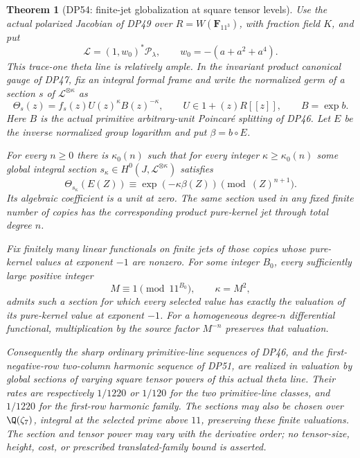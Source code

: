 \documentclass[11pt,a4paper]{article}
\newtheorem{theorem}{Theorem}[section]
\theoremstyle{definition}\newtheorem{remark}[theorem]{Remark}
\begin{document}
\begin{theorem}[DP54: finite-jet globalization at square tensor levels]\label{DP54}
Use the actual polarized Jacobian of DP49 over
$R=W(\mathbf F_{11^3})$, with fraction field $K$, and put
\[
 \mathcal L=(1,w_0)^*\mathcal P_\lambda,
 \qquad w_0=-(a+a^2+a^4).
\]
This trace-one theta line is relatively ample.
In the invariant product canonical gauge of DP47, fix an integral formal frame and write the normalized germ of a section $s$ of $\mathcal L^{\otimes\kappa}$ as
\[
 \Theta_s(z)=f_s(z)U(z)^\kappa B(z)^{-\kappa},
 \qquad U\in1+(z)R[[z]],\qquad B=\exp b.
\]
Here $B$ is the actual primitive arbitrary-unit Poincar\'e splitting of DP46.
Let $E$ be the inverse normalized group logarithm and put $\beta=b\circ E$.

For every $n\ge0$ there is $\kappa_0(n)$ such that for every integer
$\kappa\ge\kappa_0(n)$ some global integral section
$s_\kappa\in H^0(J,\mathcal L^{\otimes\kappa})$ satisfies
\begin{equation}\label{eq:globalfinitejet}
 \Theta_{s_\kappa}(E(Z))
 \equiv\exp(-\kappa\beta(Z))\pmod{(Z)^{n+1}}.
\end{equation}
Its algebraic coefficient is a unit at zero. The same section used in any fixed finite number of copies has the corresponding product pure-kernel jet through total degree $n$.

Fix finitely many linear functionals on finite jets of those copies whose pure-kernel values at exponent $-1$ are nonzero. For some integer $B_0$, every sufficiently large positive integer
\[
 M\equiv1\pmod{11^{B_0}},\qquad \kappa=M^2,
\]
admits such a section for which every selected value has exactly the valuation of its pure-kernel value at exponent $-1$.
For a homogeneous degree-$n$ differential functional, multiplication by the source factor $M^{-n}$ preserves that valuation.

Consequently the sharp ordinary primitive-line sequences of DP46, and the first-negative-row two-column harmonic sequence of DP51, are realized in valuation by global sections of varying square tensor powers of this actual theta line. Their rates are respectively $1/1220$ or $1/120$ for the two primitive-line classes, and $1/1220$ for the first-row harmonic family.
The sections may also be chosen over $\Q(\zeta_7)$, integral at the selected prime above $11$, preserving these finite valuations.
The section and tensor power may vary with the derivative order; no tensor-size, height, cost, or prescribed translated-family bound is asserted.
\end{theorem}
\end{document}
